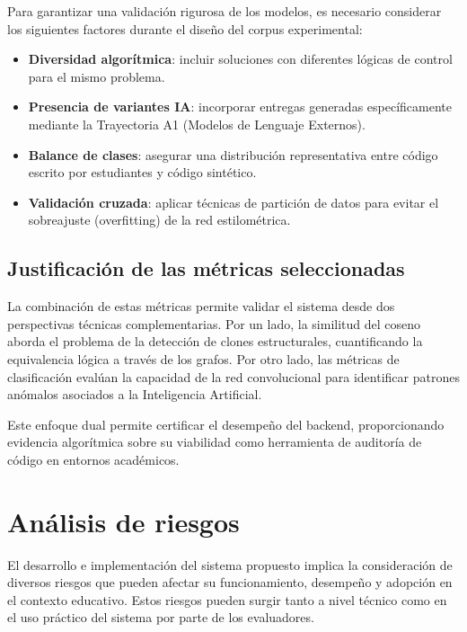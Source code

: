 Para garantizar una validación rigurosa de los modelos, es necesario considerar los siguientes factores durante el diseño del corpus experimental:

\begin{itemize}
	\item \textbf{Diversidad algorítmica}: incluir soluciones con diferentes lógicas de control para el mismo problema.
	\item \textbf{Presencia de variantes IA}: incorporar entregas generadas específicamente mediante la Trayectoria A1 (Modelos de Lenguaje Externos).
	\item \textbf{Balance de clases}: asegurar una distribución representativa entre código escrito por estudiantes y código sintético.
	\item \textbf{Validación cruzada}: aplicar técnicas de partición de datos para evitar el sobreajuste (overfitting) de la red estilométrica.
\end{itemize}

\subsection{Justificación de las métricas seleccionadas}

La combinación de estas métricas permite validar el sistema desde dos perspectivas técnicas complementarias. Por un lado, la similitud del coseno aborda el problema de la detección de clones estructurales, cuantificando la equivalencia lógica a través de los grafos. Por otro lado, las métricas de clasificación evalúan la capacidad de la red convolucional para identificar patrones anómalos asociados a la Inteligencia Artificial.

Este enfoque dual permite certificar el desempeño del backend, proporcionando evidencia algorítmica sobre su viabilidad como herramienta de auditoría de código en entornos académicos.

\section{Análisis de riesgos}

El desarrollo e implementación del sistema propuesto implica la consideración de diversos riesgos que pueden afectar su funcionamiento, desempeño y adopción en el contexto educativo. Estos riesgos pueden surgir tanto a nivel técnico como en el uso práctico del sistema por parte de los evaluadores.

